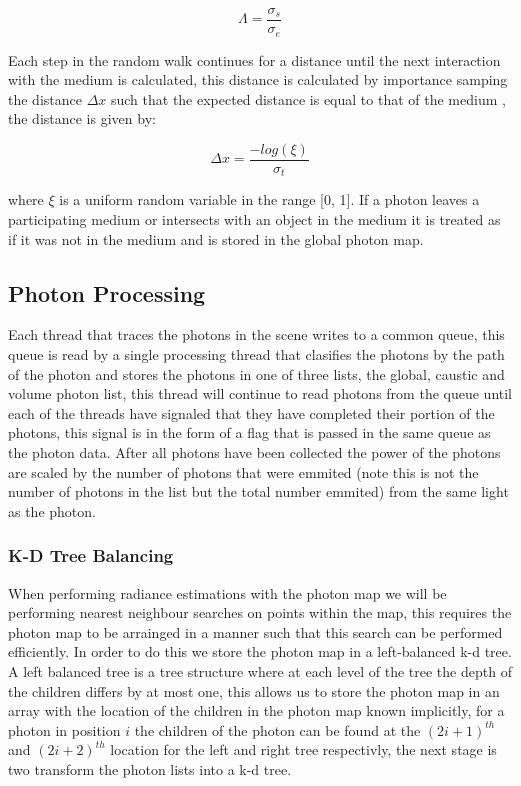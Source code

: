 \begin{equation}
\Lambda = \frac{\sigma_s}{\sigma_e}
\end{equation}

Each step in the random walk continues for a distance until the next interaction with the medium is calculated, this distance
is calculated by importance samping the distance $\Delta x$ such that the expected distance is equal to that of the medium \cite{JensenBook},
the distance is given by:

\begin{equation}
\label{eq:volume_dist_importance}
\Delta x = \frac{-log(\xi)}{\sigma_t}
\end{equation}

where $\xi$ is a uniform random variable in the range [0, 1]. If a photon leaves a participating medium or intersects with an
object in the medium it is treated as if it was not in the medium and is stored in the global photon map.

\subsection{Photon Processing}
Each thread that traces the photons in the scene writes to a common queue, this queue is read by a single processing thread
that clasifies the photons by the path of the photon and stores the photons in one of three lists, the global, caustic and
volume photon list, this thread will continue to read photons from the queue until each of the threads have signaled that they
have completed their portion of the photons, this signal is in the form of a flag that is passed in the same queue as the
photon data. After all photons have been collected the power of the photons are scaled by the number of photons that were
emmited (note this is not the number of photons in the list but the total number emmited) from the same light as the
photon.

\subsubsection{K-D Tree Balancing}
When performing radiance estimations with the photon map we will be performing nearest neighbour searches on points within
the map, this requires the photon map to be arrainged in a manner such that this search can be performed efficiently.
In order to do this we store the photon map in a left-balanced k-d tree. A left balanced tree is a tree structure where
at each level of the tree the depth of the children differs by at most one,
this allows us to store the photon map in an array with the location of the children in the photon map known implicitly,
for a photon in position $i$ the children of the photon can be found at the $(2i + 1)^{th}$ and $(2i + 2)^{th}$
location for the left and right tree respectivly, the next stage is two transform the photon lists into a k-d tree.

